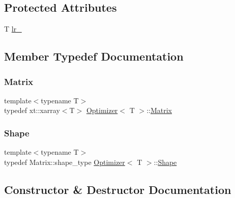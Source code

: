 \subsection*{Protected Attributes}
\begin{DoxyCompactItemize}
\item 
T \mbox{\hyperlink{class_optimizer_ae2c08a5735271a04c417dc616496fba2}{lr\+\_\+}}
\end{DoxyCompactItemize}


\subsection{Member Typedef Documentation}
\mbox{\label{class_optimizer_a1fa5c63152a16b8ff94df2d66e3a7a97}} 
\subsubsection{\texorpdfstring{Matrix}{Matrix}}
{\footnotesize\ttfamily template$<$typename T$>$ \\
typedef xt\+::xarray$<$T$>$ \mbox{\hyperlink{class_optimizer}{Optimizer}}$<$ T $>$\+::\mbox{\hyperlink{class_optimizer_a1fa5c63152a16b8ff94df2d66e3a7a97}{Matrix}}}

\mbox{\label{class_optimizer_a95929960c606690f519e24f3ed8e1ab9}} 
\subsubsection{\texorpdfstring{Shape}{Shape}}
{\footnotesize\ttfamily template$<$typename T$>$ \\
typedef Matrix\+::shape\+\_\+type \mbox{\hyperlink{class_optimizer}{Optimizer}}$<$ T $>$\+::\mbox{\hyperlink{class_optimizer_a95929960c606690f519e24f3ed8e1ab9}{Shape}}}



\subsection{Constructor \& Destructor Documentation}
\mbox{\label{class_optimizer_aaea376789a8baff0af7d215818b61bf6}} 
